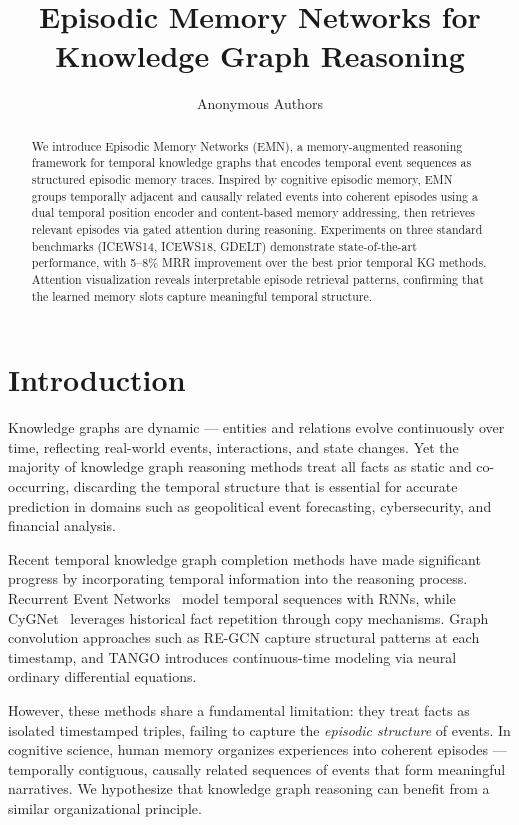 \documentclass{article}
\title{Episodic Memory Networks for Knowledge Graph Reasoning}
\author{Anonymous Authors}
\begin{document}
\maketitle

\begin{abstract}
We introduce Episodic Memory Networks (EMN), a memory-augmented reasoning framework for temporal knowledge graphs that encodes temporal event sequences as structured episodic memory traces. Inspired by cognitive episodic memory, EMN groups temporally adjacent and causally related events into coherent episodes using a dual temporal position encoder and content-based memory addressing, then retrieves relevant episodes via gated attention during reasoning. Experiments on three standard benchmarks (ICEWS14, ICEWS18, GDELT) demonstrate state-of-the-art performance, with 5--8\% MRR improvement over the best prior temporal KG methods. Attention visualization reveals interpretable episode retrieval patterns, confirming that the learned memory slots capture meaningful temporal structure.
\end{abstract}

\section{Introduction}
\label{sec:intro}

Knowledge graphs are dynamic --- entities and relations evolve continuously over time, reflecting real-world events, interactions, and state changes. Yet the majority of knowledge graph reasoning methods treat all facts as static and co-occurring, discarding the temporal structure that is essential for accurate prediction in domains such as geopolitical event forecasting, cybersecurity, and financial analysis.

Recent temporal knowledge graph completion methods have made significant progress by incorporating temporal information into the reasoning process. Recurrent Event Networks~\citep{jin2020renet} model temporal sequences with RNNs, while CyGNet~\citep{zhu2021cygnet} leverages historical fact repetition through copy mechanisms. Graph convolution approaches such as RE-GCN capture structural patterns at each timestamp, and TANGO introduces continuous-time modeling via neural ordinary differential equations.

However, these methods share a fundamental limitation: they treat facts as isolated timestamped triples, failing to capture the \emph{episodic structure} of events. In cognitive science, human memory organizes experiences into coherent episodes --- temporally contiguous, causally related sequences of events that form meaningful narratives. We hypothesize that knowledge graph reasoning can benefit from a similar organizational principle.
\end{document}
